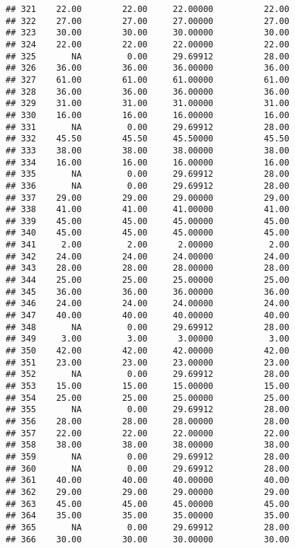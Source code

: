 \documentclass[
]{article}
\begin{document}
\begin{verbatim}
## 321    22.00        22.00     22.00000          22.00
## 322    27.00        27.00     27.00000          27.00
## 323    30.00        30.00     30.00000          30.00
## 324    22.00        22.00     22.00000          22.00
## 325       NA         0.00     29.69912          28.00
## 326    36.00        36.00     36.00000          36.00
## 327    61.00        61.00     61.00000          61.00
## 328    36.00        36.00     36.00000          36.00
## 329    31.00        31.00     31.00000          31.00
## 330    16.00        16.00     16.00000          16.00
## 331       NA         0.00     29.69912          28.00
## 332    45.50        45.50     45.50000          45.50
## 333    38.00        38.00     38.00000          38.00
## 334    16.00        16.00     16.00000          16.00
## 335       NA         0.00     29.69912          28.00
## 336       NA         0.00     29.69912          28.00
## 337    29.00        29.00     29.00000          29.00
## 338    41.00        41.00     41.00000          41.00
## 339    45.00        45.00     45.00000          45.00
## 340    45.00        45.00     45.00000          45.00
## 341     2.00         2.00      2.00000           2.00
## 342    24.00        24.00     24.00000          24.00
## 343    28.00        28.00     28.00000          28.00
## 344    25.00        25.00     25.00000          25.00
## 345    36.00        36.00     36.00000          36.00
## 346    24.00        24.00     24.00000          24.00
## 347    40.00        40.00     40.00000          40.00
## 348       NA         0.00     29.69912          28.00
## 349     3.00         3.00      3.00000           3.00
## 350    42.00        42.00     42.00000          42.00
## 351    23.00        23.00     23.00000          23.00
## 352       NA         0.00     29.69912          28.00
## 353    15.00        15.00     15.00000          15.00
## 354    25.00        25.00     25.00000          25.00
## 355       NA         0.00     29.69912          28.00
## 356    28.00        28.00     28.00000          28.00
## 357    22.00        22.00     22.00000          22.00
## 358    38.00        38.00     38.00000          38.00
## 359       NA         0.00     29.69912          28.00
## 360       NA         0.00     29.69912          28.00
## 361    40.00        40.00     40.00000          40.00
## 362    29.00        29.00     29.00000          29.00
## 363    45.00        45.00     45.00000          45.00
## 364    35.00        35.00     35.00000          35.00
## 365       NA         0.00     29.69912          28.00
## 366    30.00        30.00     30.00000          30.00

\end{verbatim}
\end{document}

